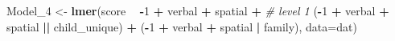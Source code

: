 \documentclass[]{article}
\newenvironment{Shaded}{\begin{snugshade}}{\end{snugshade}}
\newcommand{\KeywordTok}[1]{\textcolor[rgb]{0.13,0.29,0.53}{\textbf{#1}}}
\newcommand{\DataTypeTok}[1]{\textcolor[rgb]{0.13,0.29,0.53}{#1}}
\newcommand{\DecValTok}[1]{\textcolor[rgb]{0.00,0.00,0.81}{#1}}
\newcommand{\StringTok}[1]{\textcolor[rgb]{0.31,0.60,0.02}{#1}}
\newcommand{\CommentTok}[1]{\textcolor[rgb]{0.56,0.35,0.01}{\textit{#1}}}
\newcommand{\OperatorTok}[1]{\textcolor[rgb]{0.81,0.36,0.00}{\textbf{#1}}}
\newcommand{\NormalTok}[1]{#1}
\begin{document}
\begin{Shaded}
\begin{Highlighting}[]
\NormalTok{Model_}\DecValTok{4}\NormalTok{ <-}\StringTok{ }\KeywordTok{lmer}\NormalTok{(score }\OperatorTok{~}\StringTok{ }
\StringTok{                }\OperatorTok{-}\DecValTok{1} \OperatorTok{+}\StringTok{ }\NormalTok{verbal }\OperatorTok{+}\StringTok{ }\NormalTok{spatial }\OperatorTok{+}\StringTok{ }\CommentTok{# level 1}
\StringTok{                }\NormalTok{(}\OperatorTok{-}\DecValTok{1} \OperatorTok{+}\StringTok{ }\NormalTok{verbal }\OperatorTok{+}\StringTok{ }\NormalTok{spatial }\OperatorTok{||}\StringTok{ }\NormalTok{child_unique) }\OperatorTok{+}
\StringTok{                }\NormalTok{(}\OperatorTok{-}\DecValTok{1} \OperatorTok{+}\StringTok{ }\NormalTok{verbal }\OperatorTok{+}\StringTok{ }\NormalTok{spatial }\OperatorTok{|}\StringTok{ }\NormalTok{family),}
                \DataTypeTok{data=}\NormalTok{dat) }


\end{Highlighting}
\end{Shaded}
\end{document}
